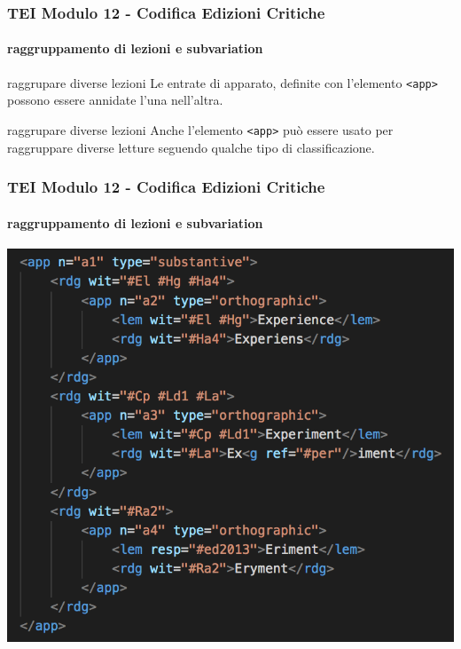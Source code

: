\begin{frame}
    \frametitle{TEI Modulo 12 - Codifica Edizioni Critiche}
    \framesubtitle{raggruppamento di lezioni e subvariation}
    \addtocounter{nframe}{1}

  

    \begin{block}{raggrupare diverse lezioni}
       Le entrate di apparato, definite con l'elemento \texttt{<app>}  possono essere annidate l'una nell'altra.
    \end{block}
    \begin{block}{raggrupare diverse lezioni}
        Anche l'elemento \texttt{<app>} può essere usato per raggruppare diverse letture seguendo qualche tipo di classificazione.
     \end{block}


\end{frame}





\begin{frame}
    \frametitle{TEI Modulo 12 - Codifica Edizioni Critiche}
    \framesubtitle{raggruppamento di lezioni e subvariation}
    \addtocounter{nframe}{1}
    

    \begin{center}
        \includegraphics[width=.95\textwidth]{imgs/nest-app.png}
    \end{center}


\end{frame}

